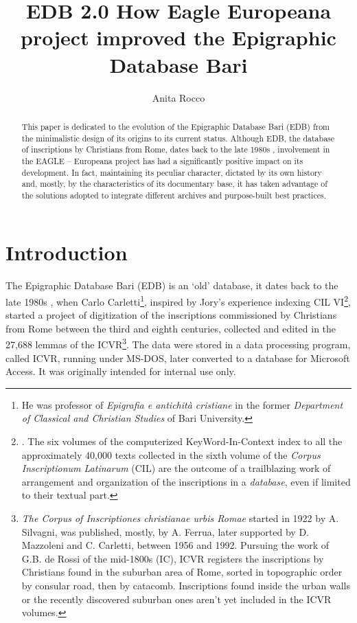 \documentclass[amsthm,ebook]{saparticle}
\title{EDB 2.0 
How Eagle Europeana project improved the Epigraphic Database Bari}
\author[uniba]{Anita Rocco \corref{first}}
\begin{document}
\maketitle
\begin{abstract}
This paper is dedicated to the evolution of the Epigraphic Database Bari (EDB) from the minimalistic design of its
origins to its current status. Although EDB, the database of inscriptions by Christians from Rome, dates back to the
late 1980s , involvement in the EAGLE – Europeana project has had a significantly positive impact on its development.
In fact, maintaining its peculiar character, dictated by its own history and, mostly, by the characteristics of its
documentary base, it has taken advantage of the solutions adopted to integrate different archives and purpose-built
best practices. 
\end{abstract}










\section{Introduction}


\noindent The Epigraphic Database Bari (EDB) is an `old' database, it dates back to the late 1980s , when Carlo Carletti\footnote{
He was professor of \emph{Epigrafia e antichità cristiane} in the former \emph{Department of Classical and Christian Studies} of Bari
University.}, inspired by Jory's experience indexing CIL VI\footnote{\citet{_corpus_1974}. The six volumes of the
computerized KeyWord-In-Context index to all the approximately 40,000 texts collected in the sixth volume of the \emph{Corpus
Inscriptionum Latinarum} (CIL) are the outcome of a trailblazing work of arrangement and organization of the
inscriptions in a \emph{database}, even if limited to their textual part.}, started a project of digitization of the
inscriptions commissioned by Christians from Rome between the third and eighth centuries, collected and edited in the
27,688 lemmas of the ICVR\footnote{\emph{The Corpus of Inscriptiones christianae urbis Romae} started in 1922 by A. Silvagni,
was published, mostly, by A. Ferrua, later supported by D. Mazzoleni and C. Carletti, between 1956 and 1992. Pursuing
the work of G.B. de Rossi of the mid-1800s (IC), ICVR registers the inscriptions by Christians found in the suburban
area of Rome, sorted in topographic order by consular road, then by catacomb. Inscriptions found inside the urban walls
or the recently discovered suburban ones aren’t yet included in the ICVR volumes.}. The data were stored in a data
processing program, called ICVR, running under MS-DOS, later converted to a database for Microsoft Access. It was
originally intended for internal use only.
\end{document}
